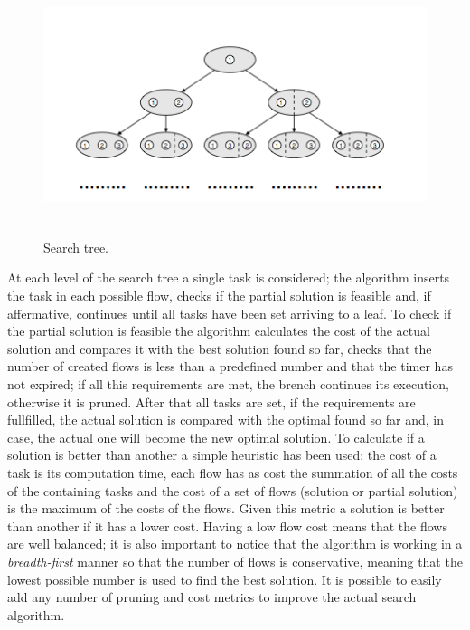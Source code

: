 \documentclass[a4paper,12pt,oneside]{book}
\begin{document}
\begin{figure}[H]
\centering
\includegraphics[width = 130mm, height = 76mm]{search_tree.png}
\caption{Search tree.}
\label{search_tree}
\end{figure}

At each level of the search tree a single task is considered; the algorithm inserts the task in each possible flow, checks if the partial solution is feasible and, if affermative, continues until all tasks have been set arriving to a leaf. To check if the partial solution is feasible the algorithm calculates the cost of the actual solution and compares it with the best solution found so far, checks that the number of created flows is less than a predefined number and that the timer has not expired; if all this requirements are met, the brench continues its execution, otherwise it is pruned. After that all tasks are set, if the requirements are fullfilled, the actual solution is compared with the optimal found so far and, in case, the actual one will become the new optimal solution. To calculate if a solution is better than another a simple heuristic has been used: the cost of a task is its computation time, each flow has as cost the summation of all the costs of the containing tasks and the cost of a set of flows (solution or partial solution) is the maximum of the costs of the flows. Given this metric a solution is better than another if it has a lower cost. Having a low flow cost means that the flows are well balanced; it is also important to notice that the algorithm is working in a \emph{breadth-first} manner so that the number of flows is conservative, meaning that the lowest possible number is used to find the best solution. It is possible to easily add any number of pruning and cost metrics to improve the actual search algorithm.
\end{document}
